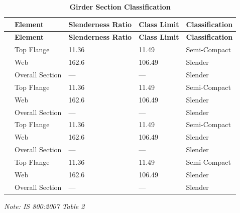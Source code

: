 \documentclass[12pt,a4paper]{report}
\numberwithin{table}{chapter}
\numberwithin{figure}{chapter}
\begin{document}
\vspace{1em}
\begin{longtable}{|C{2.5cm}|L{3cm}|C{3.5cm}|C{2.5cm}|>{\centering\arraybackslash}p{4.0cm}|}
\caption{\textbf{Girder Section Classification}}
\hline
{} \textbf{} & \textbf{Element} & \textbf{Slenderness Ratio} & \textbf{Class Limit} & \textbf{Classification} \\[6pt]
\hline
\endfirsthead
\hline
{} \textbf{} & \textbf{Element} & \textbf{Slenderness Ratio} & \textbf{Class Limit} & \textbf{Classification} \\[6pt]
\hline
\endhead
{} & Top Flange & 11.36 & 11.49 & Semi-Compact \\[6pt]
 & Web & 162.6 & 106.49 & Slender \\[6pt]
 & Overall Section & --- & --- & Slender \\[6pt]
\hline
{} & Top Flange & 11.36 & 11.49 & Semi-Compact \\[6pt]
 & Web & 162.6 & 106.49 & Slender \\[6pt]
 & Overall Section & --- & --- & Slender \\[6pt]
\hline
{} & Top Flange & 11.36 & 11.49 & Semi-Compact \\[6pt]
 & Web & 162.6 & 106.49 & Slender \\[6pt]
 & Overall Section & --- & --- & Slender \\[6pt]
\hline
{} & Top Flange & 11.36 & 11.49 & Semi-Compact \\[6pt]
 & Web & 162.6 & 106.49 & Slender \\[6pt]
 & Overall Section & --- & --- & Slender \\[6pt]
\hline
\end{longtable}
\noindent\textit{Note: IS 800:2007 Table 2}
\end{document}
